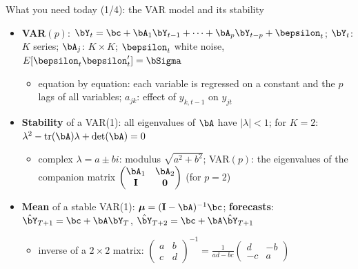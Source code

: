 \begin{frame}{What you need today (1/4): the VAR model and its stability}
\itemsize{\small}
\begin{itemize}
    \item \textbf{VAR$(p)$}: $\bY_t = \bc + \bA_1\bY_{t-1} + \dots + \bA_p\bY_{t-p} + \bepsilon_t$; $\bY_t$: $K$ series; $\bA_j$: $K \times K$; $\bepsilon_t$ white noise, $E[\bepsilon_t\bepsilon_t'] = \bSigma$
    \begin{itemize}
        \item equation by equation: each variable is regressed on a constant and the $p$ lags of all variables; $a_{jk}$: effect of $y_{k,t-1}$ on $y_{jt}$
    \end{itemize}
    \item \textbf{Stability} of a VAR(1): all eigenvalues of $\bA$ have $|\lambda| < 1$; for $K = 2$: $\lambda^2 - \mathrm{tr}(\bA)\lambda + \det(\bA) = 0$
    \begin{itemize}
        \item complex $\lambda = a \pm bi$: modulus $\sqrt{a^2 + b^2}$; VAR$(p)$: the eigenvalues of the companion matrix $\begin{pmatrix} \bA_1 & \bA_2 \\ \mathbf{I} & \mathbf{0} \end{pmatrix}$ (for $p = 2$)
    \end{itemize}
    \item \textbf{Mean} of a stable VAR(1): $\boldsymbol{\mu} = (\mathbf{I} - \bA)^{-1}\bc$; \textbf{forecasts}: $\hat\bY_{T+1} = \bc + \bA\bY_T$, $\hat\bY_{T+2} = \bc + \bA\hat\bY_{T+1}$
    \begin{itemize}
        \item inverse of a $2 \times 2$ matrix: $\begin{pmatrix} a & b \\ c & d \end{pmatrix}^{-1} = \frac{1}{ad - bc}\begin{pmatrix} d & -b \\ -c & a \end{pmatrix}$
    \end{itemize}
\end{itemize}
\end{frame}

